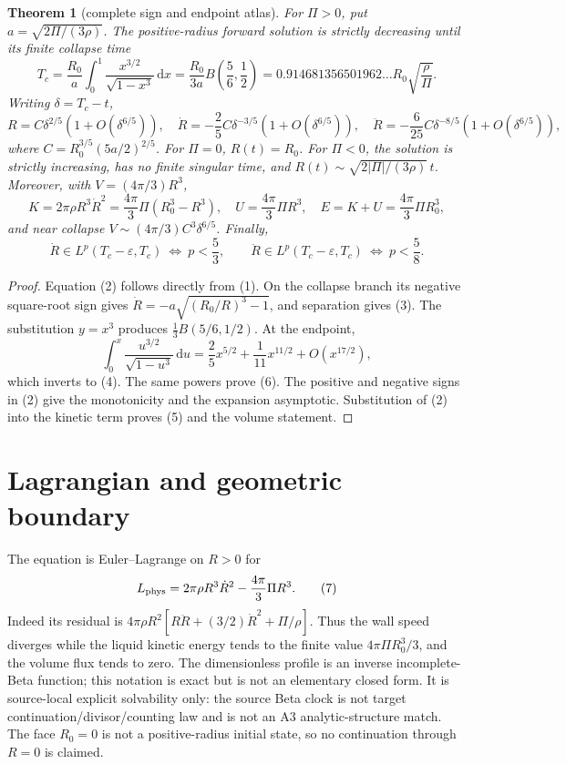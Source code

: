 \documentclass[11pt]{article}
\newtheorem{theorem}{Theorem}
\newcommand{\dd}{\,\mathrm d}
\begin{document}
\begin{theorem}[complete sign and endpoint atlas]\label{thm:atlas}
For \(\Pi>0\), put \(a=\sqrt{2\Pi/(3\rho)}\).  The positive-radius forward
solution is strictly decreasing until its finite collapse time
\begin{equation}
 T_c=\frac{R_0}{a}\int_0^1\frac{x^{3/2}}{\sqrt{1-x^3}}\dd x
 =\frac{R_0}{3a}B\!\left(\frac56,\frac12\right)
 =0.914681356501962\ldots R_0\sqrt{\frac{\rho}{\Pi}}. \tag{3}
\end{equation}
Writing \(\delta=T_c-t\),
\begin{equation}
 R=C\delta^{2/5}(1+O(\delta^{6/5})),\quad
 \dot R=-\frac25C\delta^{-3/5}(1+O(\delta^{6/5})),\quad
 \ddot R=-\frac6{25}C\delta^{-8/5}(1+O(\delta^{6/5})),
 \tag{4}
\end{equation}
where \(C=R_0^{3/5}(5a/2)^{2/5}\).  For \(\Pi=0\),
\(R(t)=R_0\).  For \(\Pi<0\), the solution is strictly increasing, has no
finite singular time, and \(R(t)\sim\sqrt{2|\Pi|/(3\rho)}\,t\).
Moreover, with \(V=(4\pi/3)R^3\),
\begin{equation}
 K=2\pi\rho R^3\dot R^2=\frac{4\pi}{3}\Pi(R_0^3-R^3),\quad
 U=\frac{4\pi}{3}\Pi R^3,\quad E=K+U=\frac{4\pi}{3}\Pi R_0^3, \tag{5}
\end{equation}
and near collapse \(V\sim(4\pi/3)C^3\delta^{6/5}\).  Finally,
\[
 \dot R\in L^p(T_c-\varepsilon,T_c)\ \Longleftrightarrow\ p<\frac53,
 \qquad
 \ddot R\in L^p(T_c-\varepsilon,T_c)\ \Longleftrightarrow\ p<\frac58.
 \tag{6}
\]
\end{theorem}

\begin{proof}
Equation (2) follows directly from (1).  On the collapse branch its negative
square-root sign gives
\(\dot R=-a\sqrt{(R_0/R)^3-1}\), and separation gives (3).  The substitution
\(y=x^3\) produces \(\frac13B(5/6,1/2)\).  At the endpoint,
\[
 \int_0^x\frac{u^{3/2}}{\sqrt{1-u^3}}\dd u
 =\frac25x^{5/2}+\frac1{11}x^{11/2}+O(x^{17/2}),
\]
which inverts to (4).  The same powers prove (6).  The positive and negative
signs in (2) give the monotonicity and the expansion asymptotic.  Substitution
of (2) into the kinetic term proves (5) and the volume statement.
\end{proof}

\section{Lagrangian and geometric boundary}
The equation is Euler--Lagrange on \(R>0\) for
\begin{equation}
 L_{\rm phys}=2\pi\rho R^3\dot R^2-\frac{4\pi}{3}\Pi R^3. \tag{7}
\end{equation}
Indeed its residual is
\(4\pi\rho R^2[R\ddot R+(3/2)\dot R^2+\Pi/\rho]\).  Thus the wall speed
diverges while the liquid kinetic energy tends to the finite value
\(4\pi\Pi R_0^3/3\), and the volume flux tends to zero.  The dimensionless
 profile is an inverse incomplete-Beta function; this notation is exact but is
not an elementary closed form.  It is source-local explicit solvability only:
the source Beta clock is not target continuation/divisor/counting law and is
not an A3 analytic-structure match.  The face \(R_0=0\) is not a
positive-radius initial state, so no continuation through \(R=0\) is claimed.
\end{document}
